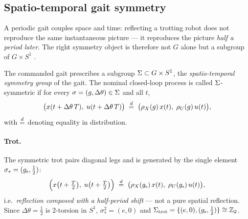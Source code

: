 \subsection{Spatio-temporal gait symmetry}
\label{sec:gait}

A periodic gait couples space and time: reflecting a trotting robot does not
reproduce the same instantaneous picture --- it reproduces the picture
\emph{half a period later}. The right symmetry object is therefore not $G$
alone but a subgroup of $G \times S^1$
\cite{golubitsky1999symmetry,collins1993coupled,golubitsky2002symmetry}.

\begin{definition}
\label{def:gait-group}
The commanded gait prescribes a subgroup
$\Sigma \subset G \times S^1$, the \emph{spatio-temporal symmetry group} of
the gait. The nominal closed-loop process is called $\Sigma$-symmetric if for
every $\sigma = (g, \Delta\theta) \in \Sigma$ and all $t$,
\begin{equation}
  \label{eq:st-symmetry}
  \bigl(x(t + \Delta\theta\, T),\; u(t + \Delta\theta\, T)\bigr)
  \;\overset{d}{=}\;
  \bigl(\rho_{X}(g)\, x(t),\; \rho_{U}(g)\, u(t)\bigr),
\end{equation}
with $\overset{d}{=}$ denoting equality in distribution.
\end{definition}

\paragraph{Trot.}
The symmetric trot pairs diagonal legs and is generated by the single element
$\sigma_* = (g_{\mathrm{s}}, \tfrac12)$:
\begin{equation}
  \label{eq:trot}
  \Bigl(x\bigl(t+\tfrac{T}{2}\bigr),\; u\bigl(t+\tfrac{T}{2}\bigr)\Bigr)
  \;\overset{d}{=}\;
  \bigl(\rho_{X}(g_{\mathrm{s}})\,x(t),\; \rho_{U}(g_{\mathrm{s}})\,u(t)\bigr),
\end{equation}
i.e.\ \emph{reflection composed with a half-period shift} --- not a pure
spatial reflection. Since $\Delta\theta = \tfrac12$ is 2-torsion in $S^1$,
$\sigma_*^2 = (e, 0)$ and $\Sigma_{\mathrm{trot}} = \{(e,0), (g_{\mathrm{s}},\tfrac12)\}
\cong \mathbb{Z}_2$.

